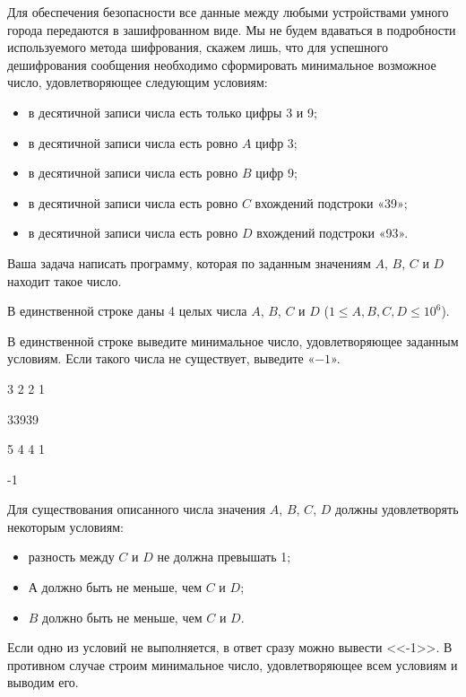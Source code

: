 
Для обеспечения
безопасности все данные между любыми устройствами умного города передаются в
зашифрованном виде. Мы не будем вдаваться в подробности используемого метода
шифрования, скажем лишь, что для успешного дешифрования сообщения необходимо
сформировать минимальное возможное число, удовлетворяющее следующим условиям:

\begin{itemize}
    \item в десятичной записи числа есть только цифры 3 и 9;
    \item в десятичной записи числа есть ровно $A$  цифр 3;
    \item в десятичной записи числа есть ровно $B$  цифр 9;
    \item в десятичной записи числа есть ровно $C$  вхождений подстроки «39»;
    \item в десятичной записи числа есть ровно $D$  вхождений подстроки «93».
\end{itemize}

Ваша задача
написать программу, которая по заданным значениям $ A $, $ B $, $ C $ и $ D $ находит такое число.


В единственной
строке даны 4 целых числа $ A $,
$ B $,
$ C $ и $ D $ ($ 1 \le A, B, C, D \le 10^6 $).

\outputfmtSection

В единственной
строке выведите минимальное число, удовлетворяющее заданным условиям. Если
такого числа не существует, выведите «$ -1 $».


\begin{myverbbox}[\small]{\vinput}
    3 2 2 1
\end{myverbbox}
\begin{myverbbox}[\small]{\voutput}
    33939
\end{myverbbox}


\begin{myverbbox}[\small]{\vinput}
    5 4 4 1
\end{myverbbox}
\begin{myverbbox}[\small]{\voutput}
    -1
\end{myverbbox}

\solutionSection

Для существования описанного числа значения $A$, $B$, $C$, $D$ 
должны удовлетворять некоторым условиям:
\begin{itemize}
    \item разность между $C$ и $D$ не должна превышать 1;
    \item $А$ должно быть не меньше, чем $C$ и $D$;
    \item $B$ должно быть не меньше, чем $C$ и $D$.
\end{itemize}

Если одно из условий не выполняется, в ответ сразу можно 
вывести <<-1>>. В противном случае строим минимальное число, 
удовлетворяющее всем условиям и выводим его.

